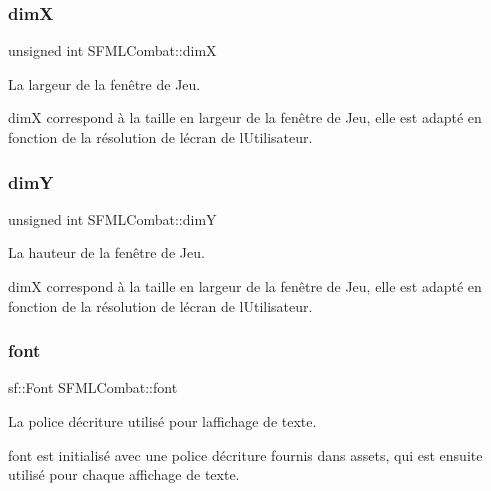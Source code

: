 \subsubsection{\texorpdfstring{dimX}{dimX}}
{\footnotesize\ttfamily unsigned int S\+F\+M\+L\+Combat\+::dimX\hspace{0.3cm}{\ttfamily [private]}}



La largeur de la fenêtre de Jeu. 

dimX correspond à la taille en largeur de la fenêtre de Jeu, elle est adapté en fonction de la résolution de l\textquotesingle{}écran de l\textquotesingle{}Utilisateur. \mbox{\label{class_s_f_m_l_combat_a07171a9f601831e2ffba2cab5c072bba}} 
\subsubsection{\texorpdfstring{dimY}{dimY}}
{\footnotesize\ttfamily unsigned int S\+F\+M\+L\+Combat\+::dimY\hspace{0.3cm}{\ttfamily [private]}}



La hauteur de la fenêtre de Jeu. 

dimX correspond à la taille en largeur de la fenêtre de Jeu, elle est adapté en fonction de la résolution de l\textquotesingle{}écran de l\textquotesingle{}Utilisateur. \mbox{\label{class_s_f_m_l_combat_a38592e5f22439c81e07f3ffee4012a5f}} 
\subsubsection{\texorpdfstring{font}{font}}
{\footnotesize\ttfamily sf\+::\+Font S\+F\+M\+L\+Combat\+::font\hspace{0.3cm}{\ttfamily [private]}}



La police d\textquotesingle{}écriture utilisé pour l\textquotesingle{}affichage de texte. 

font est initialisé avec une police d\textquotesingle{}écriture fournis dans assets, qui est ensuite utilisé pour chaque affichage de texte. \mbox{\label{class_s_f_m_l_combat_a78da4b3f5a924922d26db0b756531505}} 
